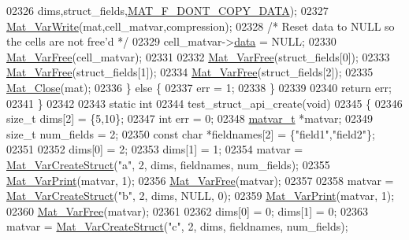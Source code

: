 \begin{DoxyCode}
{{{{{02326                             dims,struct\_fields,\hyperlink{group___m_a_t_ggab9d6ef9e3ddca78a317b173f01d53fbba762244499f52eb35e7b53fb79a1f2889}{MAT\_F\_DONT\_COPY\_DATA});
02327         \hyperlink{group___m_a_t_ga4bd3eba12df415d8226e27c457fbbb0b}{Mat\_VarWrite}(mat,cell\_matvar,compression);
02328         \textcolor{comment}{/* Reset data to NULL so the cells are not free'd */}
02329         cell\_matvar->\hyperlink{group___m_a_t_a5672978efa230bbdecdf38ede781f7fa}{data} = NULL;
02330         \hyperlink{group___m_a_t_ga1d14716f7450530fd1c9d02413787f0e}{Mat\_VarFree}(cell\_matvar);
02331 
02332         \hyperlink{group___m_a_t_ga1d14716f7450530fd1c9d02413787f0e}{Mat\_VarFree}(struct\_fields[0]);
02333         \hyperlink{group___m_a_t_ga1d14716f7450530fd1c9d02413787f0e}{Mat\_VarFree}(struct\_fields[1]);
02334         \hyperlink{group___m_a_t_ga1d14716f7450530fd1c9d02413787f0e}{Mat\_VarFree}(struct\_fields[2]);
02335         \hyperlink{group___m_a_t_ga101c92ff7bde4a2d4615661beba09262}{Mat\_Close}(mat);
02336     \} \textcolor{keywordflow}{else} \{
02337         err = 1;
02338     \}
02339 
02340     \textcolor{keywordflow}{return} err;
02341 \}
02342 
02343 \textcolor{keyword}{static} \textcolor{keywordtype}{int}
02344 test\_struct\_api\_create(\textcolor{keywordtype}{void})
02345 \{
02346     \textcolor{keywordtype}{size\_t} dims[2] = \{5,10\};
02347     \textcolor{keywordtype}{int}    err = 0;
02348     \hyperlink{group___m_a_t_structmatvar__t}{matvar\_t} *matvar;
02349     \textcolor{keywordtype}{size\_t} num\_fields = 2;
02350     \textcolor{keyword}{const} \textcolor{keywordtype}{char} *fieldnames[2] = \{\textcolor{stringliteral}{"field1"},\textcolor{stringliteral}{"field2"}\};
02351 
02352     dims[0] = 2;
02353     dims[1] = 1;
02354     matvar = \hyperlink{group___m_a_t_gacecdb682a50977e54ecbdc54ed5c31bf}{Mat\_VarCreateStruct}(\textcolor{stringliteral}{"a"}, 2, dims, fieldnames, num\_fields);
02355     \hyperlink{group___m_a_t_ga9100c145e338b84b55d5d0795d5d390a}{Mat\_VarPrint}(matvar, 1);
02356     \hyperlink{group___m_a_t_ga1d14716f7450530fd1c9d02413787f0e}{Mat\_VarFree}(matvar);
02357 
02358     matvar = \hyperlink{group___m_a_t_gacecdb682a50977e54ecbdc54ed5c31bf}{Mat\_VarCreateStruct}(\textcolor{stringliteral}{"b"}, 2, dims, NULL, 0);
02359     \hyperlink{group___m_a_t_ga9100c145e338b84b55d5d0795d5d390a}{Mat\_VarPrint}(matvar, 1);
02360     \hyperlink{group___m_a_t_ga1d14716f7450530fd1c9d02413787f0e}{Mat\_VarFree}(matvar);
02361 
02362     dims[0] = 0; dims[1] = 0;
02363     matvar = \hyperlink{group___m_a_t_gacecdb682a50977e54ecbdc54ed5c31bf}{Mat\_VarCreateStruct}(\textcolor{stringliteral}{"c"}, 2, dims, fieldnames, num\_fields);
}}}}}
\end{DoxyCode}
